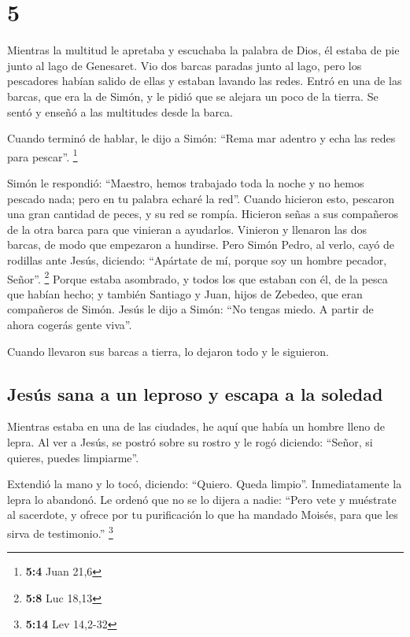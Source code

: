 \hypertarget{section-4}{%
\section{5}\label{section-4}}

 Mientras la multitud le apretaba y escuchaba la palabra
de Dios, él estaba de pie junto al lago de Genesaret.  Vio
dos barcas paradas junto al lago, pero los pescadores habían salido de
ellas y estaban lavando las redes.  Entró en una de las
barcas, que era la de Simón, y le pidió que se alejara un poco de la
tierra. Se sentó y enseñó a las multitudes desde la barca.

 Cuando terminó de hablar, le dijo a Simón: ``Rema mar
adentro y echa las redes para pescar''. \footnote{\textbf{5:4} Juan 21,6}

 Simón le respondió: ``Maestro, hemos trabajado toda la
noche y no hemos pescado nada; pero en tu palabra echaré la red''.
 Cuando hicieron esto, pescaron una gran cantidad de
peces, y su red se rompía.  Hicieron señas a sus
compañeros de la otra barca para que vinieran a ayudarlos. Vinieron y
llenaron las dos barcas, de modo que empezaron a hundirse.
 Pero Simón Pedro, al verlo, cayó de rodillas ante Jesús,
diciendo: ``Apártate de mí, porque soy un hombre pecador, Señor''.
\footnote{\textbf{5:8} Luc 18,13}  Porque estaba
asombrado, y todos los que estaban con él, de la pesca que habían hecho;
 y también Santiago y Juan, hijos de Zebedeo, que eran
compañeros de Simón. Jesús le dijo a Simón: ``No tengas miedo. A partir
de ahora cogerás gente viva''.

 Cuando llevaron sus barcas a tierra, lo dejaron todo y
le siguieron.

\hypertarget{jesuxfas-sana-a-un-leproso-y-escapa-a-la-soledad}{%
\subsection{Jesús sana a un leproso y escapa a la
soledad}\label{jesuxfas-sana-a-un-leproso-y-escapa-a-la-soledad}}

 Mientras estaba en una de las ciudades, he aquí que
había un hombre lleno de lepra. Al ver a Jesús, se postró sobre su
rostro y le rogó diciendo: ``Señor, si quieres, puedes limpiarme''.

 Extendió la mano y lo tocó, diciendo: ``Quiero. Queda
limpio''. Inmediatamente la lepra lo abandonó.  Le ordenó
que no se lo dijera a nadie: ``Pero vete y muéstrate al sacerdote, y
ofrece por tu purificación lo que ha mandado Moisés, para que les sirva
de testimonio.'' \footnote{\textbf{5:14} Lev 14,2-32}

